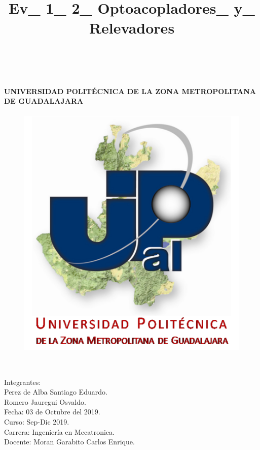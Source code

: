 \documentclass[12pt,letterpaper]{article}
\title{Ev\_ 1\_ 2\_ Optoacopladores\_ y\_ Relevadores}
\begin{document}
\maketitle
\


\paragraph{\large UNIVERSIDAD POLITÉCNICA DE LA ZONA METROPOLITANA DE GUADALAJARA}

\begin{figure}[h!]
\begin{center}

\includegraphics[scale=0.8]{Upzmg.png} 
\label{Upzmg}


\end{center}
\end{figure}
\

\large{Integrantes:}\\
\large{Perez de Alba Santiago Eduardo.\\
Romero Jauregui Osvaldo.\\

Fecha: 03 de Octubre del 2019.\\

Curso: Sep-Dic 2019.\\

Carrera: Ingeniería en Mecatronica.\\

Docente: Moran Garabito Carlos Enrique.\\
}
\end{document}
